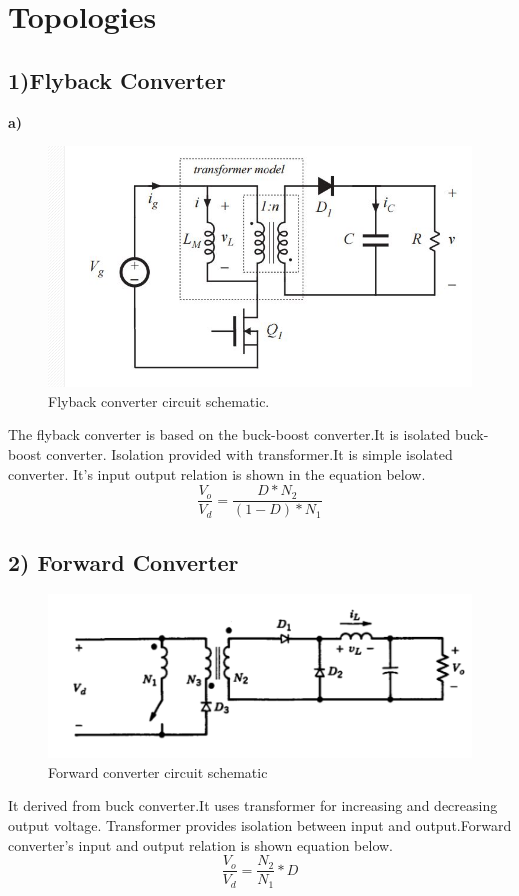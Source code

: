 \documentclass{article}
\newcommand\tab[1][1cm]{\hspace*{#1}}
\begin{document}
\section*{Topologies}
\subsection*{1)Flyback Converter}
\tab\textbf{a)}

\begin{figure}[H]
\centering
\includegraphics[width=\textwidth]{flyback.PNG}
\caption{Flyback converter circuit schematic.}
\end{figure}
\tab The flyback converter is based on the buck-boost converter.It is isolated buck-boost converter. Isolation provided with transformer.It is simple isolated converter. It's input output relation is shown in the equation below. 
\begin{equation}
    \frac{V_o}{V_d}=\frac{D*N_2}{(1-D)*N_1}
\end{equation}
\subsection*{2) Forward Converter}
\begin{figure}[h]
    \centering
    \includegraphics[scale=0.5]{forwardconverter.PNG}
    \caption{Forward converter circuit schematic }
    \label{fig:my_label}
\end{figure}
\tab\textbf{} It derived from buck converter.It uses transformer for increasing and decreasing output voltage. Transformer provides isolation between input and output.Forward converter's input and output relation is shown equation below. 
\begin{equation}
    \frac{V_o}{V_d}=\frac{N_2}{N_1}*D
\end{equation}
\end{document}
